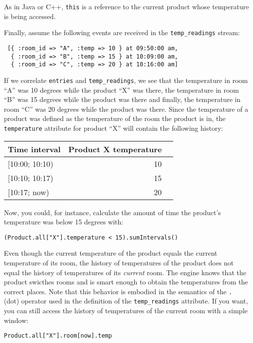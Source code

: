 \documentclass{report}
\begin{document}
As in Java or C++, \verb=this= is a reference to the current product
whose temperature is being accessed.

Finally, assume the following events are received in the
\verb=temp_readings= stream:

\begin{verbatim}
 [{ :room_id => "A", :temp => 10 } at 09:50:00 am,
  { :room_id => "B", :temp => 15 } at 10:09:00 am,
  { :room_id => "C", :temp => 20 } at 10:16:00 am]
\end{verbatim}

If we correlate \verb=entries= and \verb=temp_readings=, we see that
the temperature in room ``A'' was 10 degrees while the product ``X''
was there, the temperature in room ``B'' was 15 degrees while the
product was there and finally, the temperature in room ``C'' was 20
degrees while the product was there. Since the temperature of a
product was defined as the temperature of the room the product is in,
the \verb=temperature= attribute for product ``X'' will contain the
following history:

\begin{tabular}{ |l|r|r| }
  \hline
 Time interval & Product X temperature \\
  \hline
  $[$10:00; 10:10) & 10 \\
  $[$10:10; 10:17) & 15 \\
  $[$10:17;   now) & 20 \\
  \hline
\end{tabular}

Now, you could, for instance, calculate the amount of time the
product's temperature was below 15 degrees with:

\begin{verbatim}
(Product.all["X"].temperature < 15).sumIntervals()
\end{verbatim}

Even though the current temperature of the product equals the current
temperature of its room, the history of temperatures of the product
does not equal the history of temperatures of its \emph{current}
room. The engine knows that the product swicthes rooms and is smart
enough to obtain the temperatures from the correct places. Note that
this behavior is embodied in the semantics of the \verb=.= (dot)
operator used in the definition of the \verb=temp_readings=
attribute. If you want, you can still access the history of
temperatures of the current room with a simple window:

\begin{verbatim}
Product.all["X"].room[now].temp
\end{verbatim}
\end{document}

